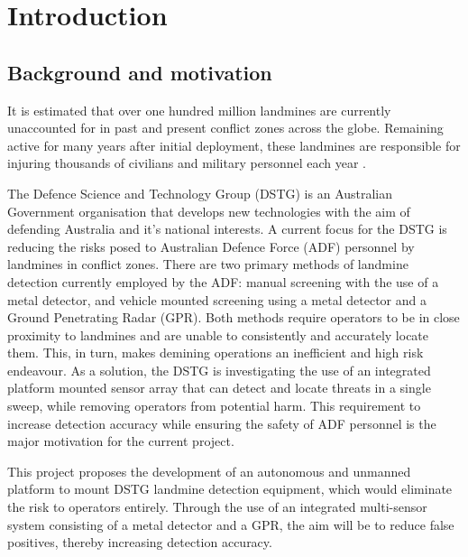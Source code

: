 \documentclass[main.tex]{subfiles}
\begin{document}

\chapter{Introduction}
\section{Background and motivation}

It is estimated that over one hundred million landmines are currently unaccounted for in past and present conflict zones across the globe. Remaining active for many years after initial deployment, these landmines are responsible for injuring thousands of civilians and military personnel each year \parencite{landmineMonitor2015}.

The Defence Science and Technology Group (DSTG) is an Australian Government organisation that develops new technologies with the aim of defending Australia and it's national interests. A current focus for the DSTG is reducing the risks posed to Australian Defence Force (ADF) personnel by landmines in conflict zones. There are two primary methods of landmine detection currently employed by the ADF: manual screening with the use of a metal detector, and vehicle mounted screening using a metal detector and a Ground Penetrating Radar (GPR). Both methods require operators to be in close proximity to landmines and are unable to consistently and accurately locate them. This, in turn, makes demining operations an inefficient and high risk endeavour. 
As a solution, the DSTG is investigating the use of an integrated platform mounted sensor array that can detect and locate threats in a single sweep, while removing operators from potential harm. This requirement to increase detection accuracy while ensuring the safety of ADF personnel is the major motivation for the current project.


This project proposes the development of an autonomous and unmanned platform to mount DSTG landmine detection equipment, which would eliminate the risk to operators entirely. Through the use of an integrated multi-sensor system consisting of a metal detector and a GPR, the aim will be to reduce false positives, thereby increasing detection accuracy.
\end{document}
